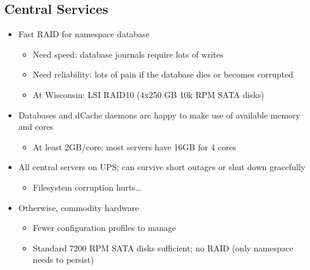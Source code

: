 \documentclass{beamer}
\begin{document}
\subsection{Central Services}
\begin{frame}
\begin{itemize}
	\item Fast RAID for namespace database
	\begin{itemize}
		\item Need speed: database journals require lots of writes
		\item Need reliability: lots of pain if the database dies or becomes corrupted
		\item At Wisconsin: LSI RAID10 (4x250 GB 10k RPM SATA disks)
	\end{itemize}
	\item Databases and dCache daemons are happy to make use of available memory and cores
	\begin{itemize}
		\item At least 2GB/core; most servers have 16GB for 4 cores
	\end{itemize}
	\item All central servers on UPS; can survive short outages or shut down gracefully
	\begin{itemize}
		\item Filesystem corruption hurts\ldots{}
	\end{itemize}
	\item Otherwise, commodity hardware
	\begin{itemize}
		\item Fewer configuration profiles to manage
		\item Standard 7200 RPM SATA disks sufficient; no RAID (only namespace needs to persist)
	\end{itemize}
\end{itemize}
\end{frame}
\end{document}
